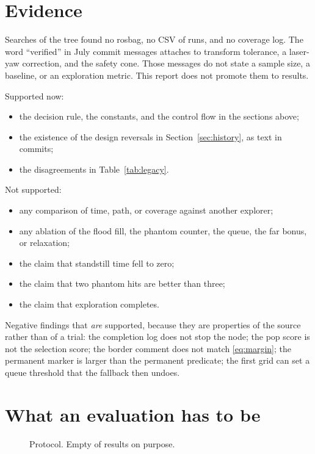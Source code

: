 \documentclass[11pt]{article}
\begin{document}
\section{Evidence}
\label{sec:evidence}
Searches of the tree found no rosbag, no CSV of runs, and no coverage log. The word ``verified'' in July commit messages attaches to transform tolerance, a laser-yaw correction, and the safety cone. Those messages do not state a sample size, a baseline, or an exploration metric. This report does not promote them to results.

Supported now:
\begin{itemize}
\item the decision rule, the constants, and the control flow in the sections above;
\item the existence of the design reversals in Section~\ref{sec:history}, as text in commits;
\item the disagreements in Table~\ref{tab:legacy}.
\end{itemize}

Not supported:
\begin{itemize}
\item any comparison of time, path, or coverage against another explorer;
\item any ablation of the flood fill, the phantom counter, the queue, the far bonus, or relaxation;
\item the claim that standstill time fell to zero;
\item the claim that two phantom hits are better than three;
\item the claim that exploration completes.
\end{itemize}

Negative findings that \emph{are} supported, because they are properties of the source rather than of a trial: the completion log does not stop the node; the pop score is not the selection score; the border comment does not match \eqref{eq:margin}; the permanent marker is larger than the permanent predicate; the first grid can set a queue threshold that the fallback then undoes.

\section{What an evaluation has to be}
\label{sec:protocol}
\begin{figure}[ht]
\centering
\FigExperiment
\caption{Protocol. Empty of results on purpose.}
\label{fig:exp}
\end{figure}
\end{document}

